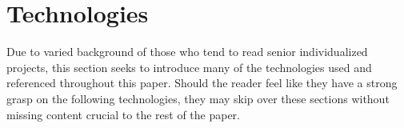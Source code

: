 \section{Technologies}
Due to varied background of those who tend to read senior individualized projects, this section seeks to introduce many of the technologies used and referenced throughout this paper.  Should the reader feel like they have a strong grasp on the following technologies, they may skip over these sections without missing content crucial to the rest of the paper.



